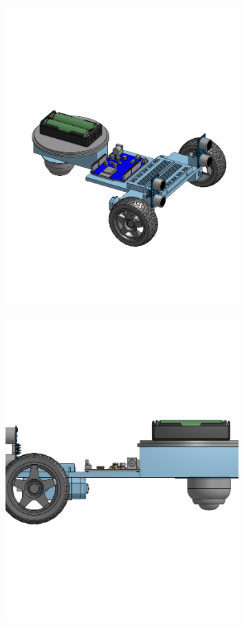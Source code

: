 \documentclass[a4paper,12pt]{article}
\begin{document}
\begin{center}\begin{figure}[H]\centering\includegraphics[width=0.8\textwidth]{./model_images/a3.png}\end{figure}\FloatBarrier\end{center}
\begin{center}\begin{figure}[H]\centering\includegraphics[width=0.8\textwidth]{./model_images/a4.png}\end{figure}\FloatBarrier\end{center}
\end{document}
